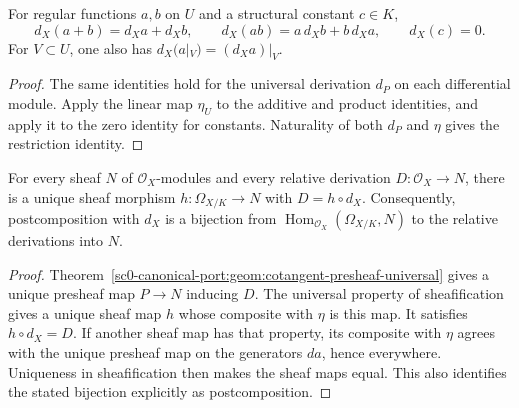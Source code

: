 \begin{lemma}
\label{sc0-canonical-port:geom:cotangent-derivation-laws}
\leanok
For regular functions \(a,b\) on \(U\) and a structural
constant \(c\in K\),
\[
 d_X(a+b)=d_Xa+d_Xb,\qquad
 d_X(ab)=a\,d_Xb+b\,d_Xa,\qquad d_X(c)=0.
\]
For \(V\subset U\), one also has
\(d_X(a|_V)=(d_Xa)|_V\).
\end{lemma}
\begin{proof}
The same identities hold for the universal derivation \(d_P\)
on each differential module. Apply the linear map \(\eta_U\)
to the additive and product identities, and apply it to the zero
identity for constants. Naturality of both \(d_P\) and
\(\eta\) gives the restriction identity.
\end{proof}

\begin{theorem}
\label{sc0-canonical-port:geom:cotangent-sheaf-universal}
\leanok
For every sheaf \(N\) of \(\mathcal O_X\)-modules and every
relative derivation \(D:\mathcal O_X\to N\), there is a unique
sheaf morphism \(h:\Omega_{X/K}\to N\) with
\(D=h\circ d_X\). Consequently, postcomposition with \(d_X\)
is a bijection from \(\operatorname{Hom}_{\mathcal O_X}
(\Omega_{X/K},N)\) to the relative derivations into \(N\).
\end{theorem}
\begin{proof}
Theorem~\ref{sc0-canonical-port:geom:cotangent-presheaf-universal} gives a unique
presheaf map \(P\to N\) inducing \(D\). The universal
property of sheafification gives a unique sheaf map \(h\)
whose composite with \(\eta\) is this map. It satisfies
\(h\circ d_X=D\). If another sheaf map has that property,
its composite with \(\eta\) agrees with the unique presheaf
map on the generators \(da\), hence everywhere. Uniqueness
in sheafification then makes the sheaf maps equal. This also
identifies the stated bijection explicitly as postcomposition.
\end{proof}

